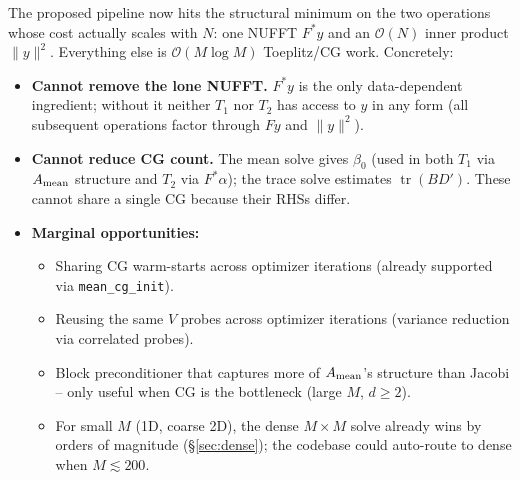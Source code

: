 \documentclass[11pt]{article}
\newcommand{\tr}{\operatorname{tr}}
\newcommand{\bigo}{\mathcal{O}}
\begin{document}
The proposed pipeline now hits the structural minimum on the two operations whose cost actually scales with $N$: one NUFFT $F^*y$ and an $\bigo(N)$ inner product $\|y\|^2$. Everything else is $\bigo(M\log M)$ Toeplitz/CG work. Concretely:
\begin{itemize}
\item \textbf{Cannot remove the lone NUFFT.} $F^*y$ is the only data-dependent ingredient; without it neither $T_1$ nor $T_2$ has access to $y$ in any form (all subsequent operations factor through $Fy$ and $\|y\|^2$).
\item \textbf{Cannot reduce CG count.} The mean solve gives $\beta_0$ (used in both $T_1$ via $A_{\rm mean}$ structure and $T_2$ via $F^*\alpha$); the trace solve estimates $\tr(BD')$. These cannot share a single CG because their RHSs differ.
\item \textbf{Marginal opportunities:}
  \begin{itemize}
  \item Sharing CG warm-starts across optimizer iterations (already supported via \texttt{mean\_cg\_init}).
  \item Reusing the same $V$ probes across optimizer iterations (variance reduction via correlated probes).
  \item Block preconditioner that captures more of $A_{\rm mean}$'s structure than Jacobi -- only useful when CG is the bottleneck (large $M$, $d\geq 2$).
  \item For small $M$ (1D, coarse 2D), the dense $M\times M$ solve already wins by orders of magnitude (\S\ref{sec:dense}); the codebase could auto-route to dense when $M\lesssim 200$.
  \end{itemize}
\end{itemize}
\end{document}
